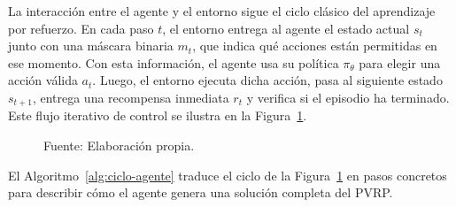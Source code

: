 La interacción entre el agente y el entorno sigue el ciclo clásico del aprendizaje por refuerzo. En cada paso $t$, el entorno entrega al agente el estado actual $s_t$ junto con una máscara binaria $m_t$, que indica qué acciones están permitidas en ese momento. Con esta información, el agente usa su política $\pi_\theta$ para elegir una acción válida $a_t$. Luego, el entorno ejecuta dicha acción, pasa al siguiente estado $s_{t+1}$, entrega una recompensa inmediata $r_t$ y verifica si el episodio ha terminado. Este flujo iterativo de control se ilustra en la Figura~\ref{fig:Ciclo}. 


\begin{figure}[H]
    \centering
    \caption{\label{fig:Ciclo} Ciclo de interacción agente-entorno en el MDP del PVRP.}
    \caption*{Fuente: Elaboración propia.}
\end{figure}

El Algoritmo~\ref{alg:ciclo-agente} traduce el ciclo de la Figura~\ref{fig:Ciclo} en pasos concretos para describir cómo el agente genera una solución completa del PVRP.

